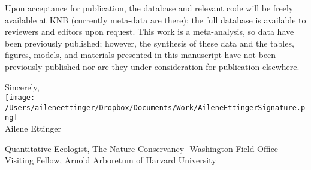 \documentclass[11.5pt,a4paper]{letter}
\begin{document}
\begin{letter}{}
\par Upon acceptance for publication, the database and relevant code will be freely available at KNB (currently meta-data are there); the full database is available to reviewers and editors upon request. This work is a meta-analysis, so data have been previously published; however, the synthesis of these data and the tables, figures, models, and materials presented in this manuscript have not been previously published nor are they under consideration for publication elsewhere.

Sincerely,\\

\texttt{[image: /Users/aileneettinger/Dropbox/Documents/Work/AileneEttingerSignature.png]} \\
Ailene Ettinger\\
\begin{footnotesize}
Quantitative Ecologist, The Nature Conservancy- Washington Field Office\\
Visiting Fellow, Arnold Arboretum of Harvard University 
\end{footnotesize}

\end{letter}
\end{document}
